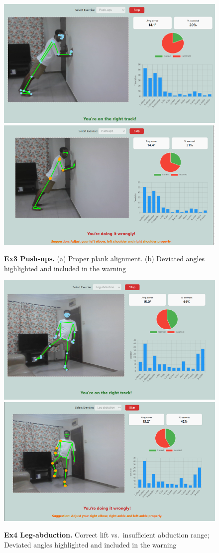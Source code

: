 \documentclass{article}
\begin{document}
\begin{figure}[H]
  \centering
  \includegraphics[width=.48\linewidth]{figs/ex3_correct.png}%
  \hfill
  \includegraphics[width=.48\linewidth]{figs/ex3_bad_form.png}
  \caption{\textbf{Ex3 Push-ups.}
           (a) Proper plank alignment.  (b) Deviated angles highlighted and included in the warning}
  \label{fig:qual_ex3}
\end{figure}

\begin{figure}[H]
  \centering
  \includegraphics[width=.48\linewidth]{figs/ex4_correct.png}%
  \hfill
  \includegraphics[width=.48\linewidth]{figs/ex4_bad_form.png}
  \caption{\textbf{Ex4 Leg-abduction.}
           Correct lift vs.\ insufficient abduction range; Deviated angles highlighted and included in the warning}
  \label{fig:qual_ex4}
\end{figure}
\end{document}
